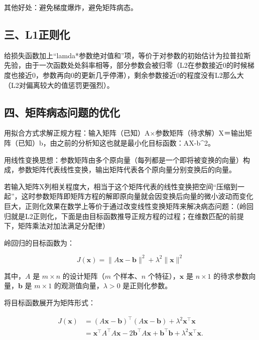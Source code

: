 其他好处：避免梯度爆炸，避免矩阵病态。

\hypertarget{ux4e09l1ux6b63ux5219ux5316}{%
\subsection{三、L1正则化}\label{ux4e09l1ux6b63ux5219ux5316}}

给损失函数加上``lamda*参数绝对值和''项，等价于对参数的初始估计为拉普拉斯先验，由于一次函数处处斜率相等，部分参数会被归零（L2在参数接近0的时候梯度也接近0，参数再向0的更新几乎停滞），剩余参数接近0的程度没有L2那么大（L2对偏离较大的值惩罚更强烈）。

\hypertarget{ux56dbux77e9ux9635ux75c5ux6001ux95eeux9898ux7684ux4f18ux5316}{%
\subsection{四、矩阵病态问题的优化}\label{ux56dbux77e9ux9635ux75c5ux6001ux95eeux9898ux7684ux4f18ux5316}}

用拟合方式求解正规方程：输入矩阵（已知）A×参数矩阵（待求解）X＝输出矩阵（已知）b，由之前的分析知这也就是最小化目标函数：\textbar\textbar AX-b\textbar\textbar\^{}2。

用线性变换思想：参数矩阵由多个原向量（每列都是一个即将被变换的向量）构成，参数矩阵代表线性变换，输出矩阵代表各个原向量分别变换后的向量。

若输入矩阵X列相关程度大，相当于这个矩阵代表的线性变换把空间``压缩到一起''，这时参数矩阵即矩阵方程的解即原向量就会因变换后向量的微小波动而变化巨大，正则化效果在数学上等价于通过改变线性变换矩阵来解决病态问题：（岭回归就是L2正则化，下面是由目标函数推导正规方程的过程；在维数匹配的前提下，矩阵乘法对加法满足分配律）

岭回归的目标函数为：

\[
J(\mathbf{x})=\lVert A\mathbf{x}-\mathbf{b}\rVert^2+\lambda^2\lVert\mathbf{x}\rVert^2
\]

其中，\(A\) 是 \(m\times n\) 的设计矩阵（\(m\) 个样本、\(n\) 个特征），\(\mathbf{x}\) 是 \(n\times 1\) 的待求参数向量，\(\mathbf{b}\) 是 \(m\times 1\) 的观测值向量，\(\lambda>0\) 是正则化参数。

将目标函数展开为矩阵形式：

\[
\begin{aligned}
J(\mathbf{x})
&=(A\mathbf{x}-\mathbf{b})^\top(A\mathbf{x}-\mathbf{b})
+\lambda^2\mathbf{x}^\top\mathbf{x}\\
&=\mathbf{x}^\top A^\top A\mathbf{x}
-2\mathbf{b}^\top A\mathbf{x}
+\mathbf{b}^\top\mathbf{b}
+\lambda^2\mathbf{x}^\top\mathbf{x}.
\end{aligned}
\]

